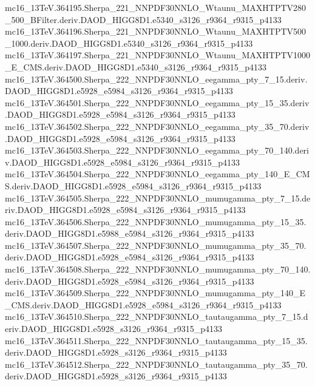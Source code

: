 \begin{footnotesize}
mc16\_13TeV.364195.Sherpa\_221\_NNPDF30NNLO\_Wtaunu\_MAXHTPTV280\_500\_BFilter.deriv.DAOD\_HIGG8D1.e5340\_s3126\_r9364\_r9315\_p4133 \\
mc16\_13TeV.364196.Sherpa\_221\_NNPDF30NNLO\_Wtaunu\_MAXHTPTV500\_1000.deriv.DAOD\_HIGG8D1.e5340\_s3126\_r9364\_r9315\_p4133 \\
mc16\_13TeV.364197.Sherpa\_221\_NNPDF30NNLO\_Wtaunu\_MAXHTPTV1000\_E\_CMS.deriv.DAOD\_HIGG8D1.e5340\_s3126\_r9364\_r9315\_p4133 \\
mc16\_13TeV.364500.Sherpa\_222\_NNPDF30NNLO\_eegamma\_pty\_7\_15.deriv.DAOD\_HIGG8D1.e5928\_e5984\_s3126\_r9364\_r9315\_p4133 \\
mc16\_13TeV.364501.Sherpa\_222\_NNPDF30NNLO\_eegamma\_pty\_15\_35.deriv.DAOD\_HIGG8D1.e5928\_e5984\_s3126\_r9364\_r9315\_p4133 \\
mc16\_13TeV.364502.Sherpa\_222\_NNPDF30NNLO\_eegamma\_pty\_35\_70.deriv.DAOD\_HIGG8D1.e5928\_e5984\_s3126\_r9364\_r9315\_p4133 \\
mc16\_13TeV.364503.Sherpa\_222\_NNPDF30NNLO\_eegamma\_pty\_70\_140.deriv.DAOD\_HIGG8D1.e5928\_e5984\_s3126\_r9364\_r9315\_p4133 \\
mc16\_13TeV.364504.Sherpa\_222\_NNPDF30NNLO\_eegamma\_pty\_140\_E\_CMS.deriv.DAOD\_HIGG8D1.e5928\_e5984\_s3126\_r9364\_r9315\_p4133 \\
mc16\_13TeV.364505.Sherpa\_222\_NNPDF30NNLO\_mumugamma\_pty\_7\_15.deriv.DAOD\_HIGG8D1.e5928\_e5984\_s3126\_r9364\_r9315\_p4133 \\
mc16\_13TeV.364506.Sherpa\_222\_NNPDF30NNLO\_mumugamma\_pty\_15\_35.deriv.DAOD\_HIGG8D1.e5988\_e5984\_s3126\_r9364\_r9315\_p4133 \\
mc16\_13TeV.364507.Sherpa\_222\_NNPDF30NNLO\_mumugamma\_pty\_35\_70.deriv.DAOD\_HIGG8D1.e5928\_e5984\_s3126\_r9364\_r9315\_p4133 \\
mc16\_13TeV.364508.Sherpa\_222\_NNPDF30NNLO\_mumugamma\_pty\_70\_140.deriv.DAOD\_HIGG8D1.e5928\_e5984\_s3126\_r9364\_r9315\_p4133 \\
mc16\_13TeV.364509.Sherpa\_222\_NNPDF30NNLO\_mumugamma\_pty\_140\_E\_CMS.deriv.DAOD\_HIGG8D1.e5928\_e5984\_s3126\_r9364\_r9315\_p4133 \\
mc16\_13TeV.364510.Sherpa\_222\_NNPDF30NNLO\_tautaugamma\_pty\_7\_15.deriv.DAOD\_HIGG8D1.e5928\_s3126\_r9364\_r9315\_p4133 \\
mc16\_13TeV.364511.Sherpa\_222\_NNPDF30NNLO\_tautaugamma\_pty\_15\_35.deriv.DAOD\_HIGG8D1.e5928\_s3126\_r9364\_r9315\_p4133 \\
mc16\_13TeV.364512.Sherpa\_222\_NNPDF30NNLO\_tautaugamma\_pty\_35\_70.deriv.DAOD\_HIGG8D1.e5928\_s3126\_r9364\_r9315\_p4133 \\

\end{footnotesize}
